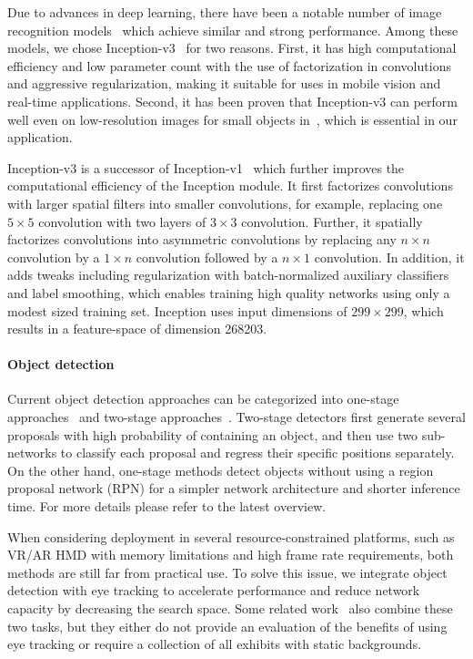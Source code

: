 Due to advances in deep learning, there have been a notable number of image
recognition models~\cite{simonyan2014very, szegedy2015going,
szegedy2016rethinking, he2016deep, szegedy2017inception} which achieve similar
and strong performance. Among these models, we chose
Inception-v3~\cite{szegedy2016rethinking} for two reasons. First, it has high
computational efficiency and low parameter count with the use of factorization
in convolutions and aggressive regularization, making it suitable for uses
in mobile vision and real-time applications. Second, it has been proven that
Inception-v3 can perform well even on low-resolution images for small objects
in~\cite{szegedy2016rethinking}, which is essential in our application.

Inception-v3 is a successor of Inception-v1~\cite{szegedy2015going} which
further improves the computational efficiency of the Inception module. It first
factorizes convolutions with larger spatial filters into smaller convolutions,
for example, replacing one $5 \times 5$ convolution with two layers of $3 \times
3$ convolution. Further, it spatially factorizes convolutions into asymmetric
convolutions by replacing any $n \times n$ convolution by a $1 \times n$
convolution followed by a $n \times 1$ convolution. In addition, it adds tweaks
including regularization with batch-normalized auxiliary classifiers and label
smoothing, which enables training high quality networks using only a modest
sized training set. Inception uses input dimensions of \(299 \times 299\), which
results in a feature-space of dimension 268203.

\paragraph{Object detection}

Current object detection approaches can be categorized into one-stage
approaches~\cite{redmon2016you, liu2016ssd, lin2017focal} and two-stage
approaches~\cite{girshick2014rich, girshick2015fast, ren2015faster, he2017mask}.
Two-stage detectors first generate several proposals with high probability of
containing an object, and then use two sub-networks to classify each
proposal and regress their specific positions separately. On the other hand,
one-stage methods detect objects without using a region proposal network (RPN)
for a simpler network architecture and shorter inference time. For more details
please refer to the latest overview\cite{liu2020deep}.

When considering deployment in several resource-constrained platforms, such as
VR/AR HMD with memory limitations and high frame rate requirements, both methods
are still far from practical use. To solve this issue, we integrate object
detection with eye tracking to accelerate performance and reduce network
capacity by decreasing the search space. Some related work~\cite{toyama2012gaze,
ishiguro2010aided, bonino2009blueprint} also combine these two tasks, but they
either do not provide an evaluation of the benefits of using eye tracking or
require a collection of all exhibits with static backgrounds.

